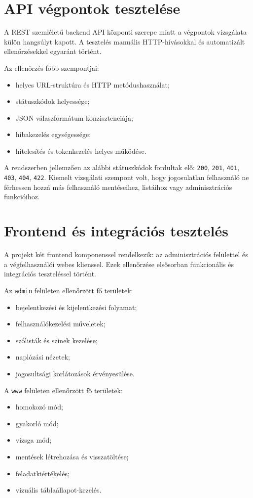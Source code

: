 \documentclass{thesis-ekf}
\begin{document}
\section{API végpontok tesztelése}
A REST szemléletű backend API központi szerepe miatt a végpontok vizsgálata külön hangsúlyt kapott. A tesztelés manuális HTTP-hívásokkal és automatizált ellenőrzésekkel egyaránt történt.

Az ellenőrzés főbb szempontjai:
\begin{itemize}
  \item helyes URL-struktúra és HTTP metódushasználat;
  \item státuszkódok helyessége;
  \item JSON válaszformátum konzisztenciája;
  \item hibakezelés egységessége;
  \item hitelesítés és tokenkezelés helyes működése.
\end{itemize}

A rendszerben jellemzően az alábbi státuszkódok fordultak elő: \texttt{200}, \texttt{201}, \texttt{401}, \texttt{403}, \texttt{404}, \texttt{422}. Kiemelt vizsgálati szempont volt, hogy jogosulatlan felhasználó ne férhessen hozzá más felhasználó mentéseihez, listáihoz vagy adminisztrációs funkcióihoz.

\section{Frontend és integrációs tesztelés}
A projekt két frontend komponenssel rendelkezik: az adminisztrációs felülettel és a végfelhasználói webes klienssel. Ezek ellenőrzése elsősorban funkcionális és integrációs teszteléssel történt.

Az \texttt{admin} felületen ellenőrzött fő területek:
\begin{itemize}
  \item bejelentkezési és kijelentkezési folyamat;
  \item felhasználókezelési műveletek;
  \item szólisták és színek kezelése;
  \item naplózási nézetek;
  \item jogosultsági korlátozások érvényesülése.
\end{itemize}

A \texttt{www} felületen ellenőrzött fő területek:
\begin{itemize}
  \item homokozó mód;
  \item gyakorló mód;
  \item vizsga mód;
  \item mentések létrehozása és visszatöltése;
  \item feladatkiértékelés;
  \item vizuális táblaállapot-kezelés.
\end{itemize}
\end{document}

